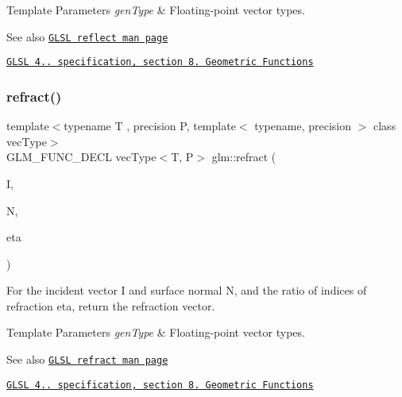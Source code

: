\begin{DoxyTemplParams}{Template Parameters}
{\em gen\+Type} & Floating-\/point vector types.\\
\hline
\end{DoxyTemplParams}
\begin{DoxySeeAlso}{See also}
\href{http://www.opengl.org/sdk/docs/manglsl/xhtml/reflect.xml}{\tt G\+L\+SL reflect man page} 

\href{http://www.opengl.org/registry/doc/GLSLangSpec.4.20.8.pdf}{\tt G\+L\+SL 4.. specification, section 8. Geometric Functions} 
\end{DoxySeeAlso}
\mbox{\label{group__core__func__geometric_gab7e7cdf4403931a5f7b74560ad64159b}} 
\subsubsection{\texorpdfstring{refract()}{refract()}}
{\footnotesize\ttfamily template$<$typename T , precision P, template$<$ typename, precision $>$ class vec\+Type$>$ \\
G\+L\+M\+\_\+\+F\+U\+N\+C\+\_\+\+D\+E\+CL vec\+Type$<$T, P$>$ glm\+::refract (\begin{DoxyParamCaption}\item[{vec\+Type$<$ T, P $>$ const \&}]{I,  }\item[{vec\+Type$<$ T, P $>$ const \&}]{N,  }\item[{T}]{eta }\end{DoxyParamCaption})}

For the incident vector I and surface normal N, and the ratio of indices of refraction eta, return the refraction vector.


\begin{DoxyTemplParams}{Template Parameters}
{\em gen\+Type} & Floating-\/point vector types.\\
\hline
\end{DoxyTemplParams}
\begin{DoxySeeAlso}{See also}
\href{http://www.opengl.org/sdk/docs/manglsl/xhtml/refract.xml}{\tt G\+L\+SL refract man page} 

\href{http://www.opengl.org/registry/doc/GLSLangSpec.4.20.8.pdf}{\tt G\+L\+SL 4.. specification, section 8. Geometric Functions} 
\end{DoxySeeAlso}
